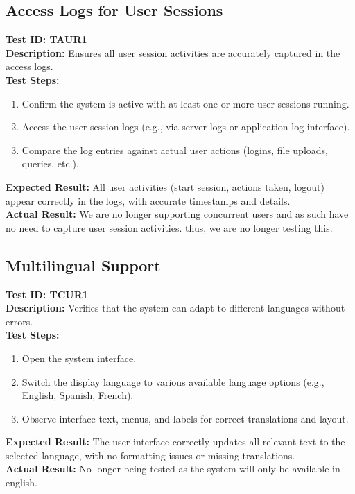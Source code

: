 \documentclass[12pt, titlepage]{article}
\begin{document}
\subsection{Access Logs for User Sessions}
\textbf{Test ID: TAUR1}\\
\textbf{Description:} Ensures all user session activities are accurately captured in the access logs.\\
\textbf{Test Steps:}
\begin{enumerate}
    \item Confirm the system is active with at least one or more user sessions running.
    \item Access the user session logs (e.g., via server logs or application log interface).
    \item Compare the log entries against actual user actions (logins, file uploads, queries, etc.).
\end{enumerate}
\textbf{Expected Result:} All user activities (start session, actions taken, logout) appear correctly in the logs, with accurate timestamps and details.\\
\textbf{Actual Result:} We are no longer supporting concurrent users and as such have no need to capture user session activities. thus, we are no longer testing this.

\subsection{Multilingual Support}
\textbf{Test ID: TCUR1}\\
\textbf{Description:} Verifies that the system can adapt to different languages without errors.\\
\textbf{Test Steps:}
\begin{enumerate}
    \item Open the system interface.
    \item Switch the display language to various available language options (e.g., English, Spanish, French).
    \item Observe interface text, menus, and labels for correct translations and layout.
\end{enumerate}
\textbf{Expected Result:} The user interface correctly updates all relevant text to the selected language, with no formatting issues or missing translations.\\
\textbf{Actual Result:} No longer being tested as the system will only be available in english.
\end{document}
